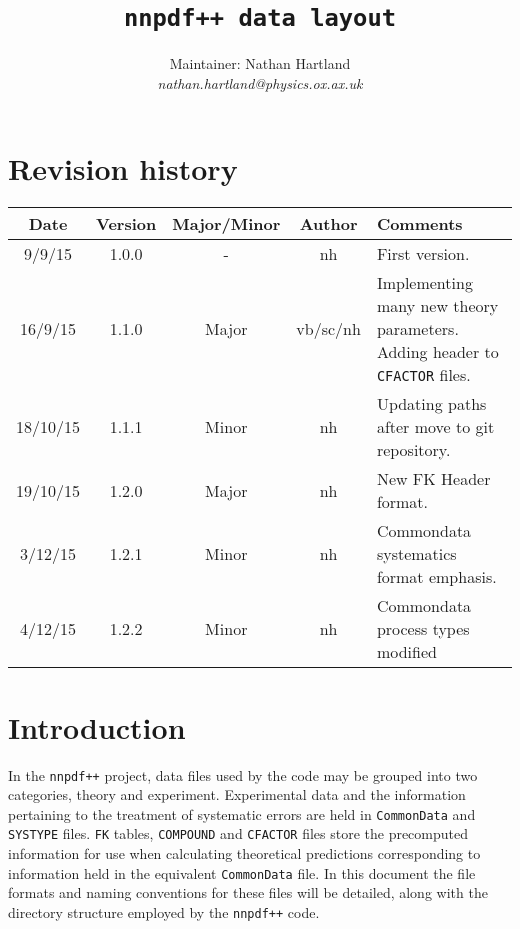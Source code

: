 \documentclass[11pt]{article}
\title{\tt{nnpdf++} data layout}
\author{Maintainer: Nathan Hartland\\ {\it nathan.hartland@physics.ox.ax.uk }}
\begin{document}
\maketitle
\tableofcontents
\clearpage
\section{Revision history}

\begin{table}[htp]
\begin{center}
\begin{tabular}{|c|c|c|c|p{50mm}|}
\hline
Date & Version & Major/Minor & Author & Comments\\
\hline\hline
9/9/15 & 1.0.0 & - & nh & First version.\\
\hline
16/9/15 & 1.1.0 & Major & vb/sc/nh & Implementing many \newline new theory parameters. \newline Adding header to {\tt CFACTOR} files.\\
\hline
18/10/15 & 1.1.1 & Minor & nh & Updating paths after move to git repository. \\
\hline
19/10/15 & 1.2.0 & Major & nh & New FK Header format. \\
\hline
3/12/15 & 1.2.1 & Minor & nh & Commondata systematics format emphasis. \\
\hline
4/12/15 & 1.2.2 & Minor & nh & Commondata process types modified \\
\hline
\end{tabular}
\end{center}
\label{tab:revsum}
\end{table}%

\clearpage

\section{Introduction}

In the {\tt nnpdf++} project, data files used by the code may be grouped into two categories, theory and experiment. Experimental data and the information pertaining to the treatment of systematic errors are held in {\tt CommonData} and {\tt SYSTYPE} files. {\tt FK} tables, {\tt COMPOUND} and {\tt CFACTOR} files store the precomputed information for use when calculating theoretical predictions corresponding to information held in the equivalent {\tt CommonData} file. In this document the file formats and naming conventions for these files will be detailed, along with the directory structure employed by the {\tt nnpdf++} code.
\end{document}
